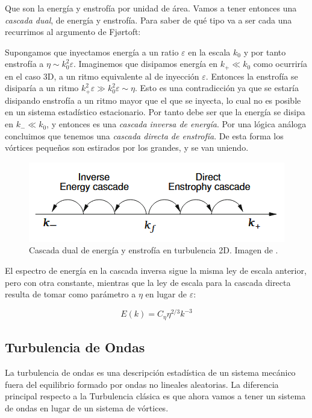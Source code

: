 Que son la energía y enstrofía por unidad de área. Vamos a tener entonces una \textit{cascada dual}, de energía y enstrofía. Para saber de qué tipo va a ser cada una recurrimos al argumento de Fjørtoft:

Supongamos que inyectamos energía a un ratio $\varepsilon$ en la escala $k_0$ y por tanto enstrofía a $\eta\sim k_0^2\varepsilon$. Imaginemos que disipamos energía en $k_+\ll k_0$ como ocurriría en el caso 3D, a un ritmo equivalente al de inyección $\varepsilon$. Entonces la enstrofía se disiparía a un ritmo $k_+^2\varepsilon\gg k_0^2\varepsilon\sim \eta$. Esto es una contradicción ya que se estaría disipando enstrofía a un ritmo mayor que el que se inyecta, lo cual no es posible en un sistema estadístico estacionario. Por tanto debe ser que la energía se disipa en $k_-\ll k_0$, y entonces es una \textit{cascada inversa de energía}. Por una lógica análoga concluimos que tenemos una \textit{cascada directa de enstrofía}. De esta forma los vórtices pequeños son estirados por los grandes, y se van uniendo.



\begin{figure}[!ht]
	\centering
	\includegraphics[width=0.7\linewidth]{Figures/Antecedentes_teoricos/Dual_Energy_cascade}
	\caption{Cascada dual de energía y enstrofía en turbulencia 2D. Imagen de \cite{nazarenkoWaveTurbulence2011}.}
	\label{fig:dualenergycascade}
\end{figure}


El espectro de energía en la cascada inversa sigue la misma ley de escala anterior, pero con otra constante, mientras que la ley de escala para la cascada directa resulta de tomar como parámetro a $\eta$ en lugar de $\varepsilon$:

\begin{equation}
	E(k) = C_\eta \eta^{2/3} k^{-3} %
\end{equation}



\subsection*{Turbulencia de Ondas}
La turbulencia de ondas es una descripción estadística de un sistema mecánico fuera del equilibrio formado por ondas no lineales aleatorias. La diferencia principal respecto a la Turbulencia clásica es que ahora vamos a tener un sistema de ondas en lugar de un sistema de vórtices. 

